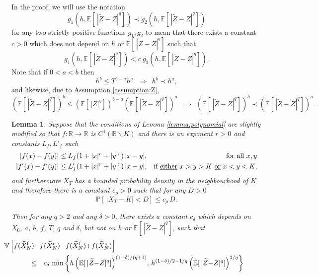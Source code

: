 \documentclass[11pt]{article}
\def \RR {{\mathbb{R}}}
\def \EE {{\mathbb{E}}}
\def \VV {{\mathbb{V}}}
\def \PP {{\mathbb{P}}}
\def \tZ {{\widetilde{Z}}}
\def \tXf  {{\widetilde{X}^{\rm f}}}
\def \tXc  {{\widetilde{X}^{\rm c}}}
\def \hXf {{\widehat{X}^{\rm f}}}
\def \hXc {{\widehat{X}^{\rm c}}}
\newtheorem{lemma}[theorem]{Lemma}
\begin{document}
In the proof, we will use the notation
\[
g_1(h, \EE[\, |\tZ{-}Z|^q]) \prec g_2(h, \EE[\, |\tZ{-}Z|^q])
\]
for any two strictly positive functions $g_1, g_2$ to mean that there
exists a constant $c\!>\!0$ which does not depend on $h$ or
$\EE[\, |\tZ{-}Z|^q]$ such that
\[
g_1(h, \EE[\, |\tZ{-}Z|^q]) < c\ g_2(h, \EE[\, |\tZ{-}Z|^q]).
\]
Note that if $0\!<\!a\!<\!b$ then
\[
h^b \leq T^{b-a} h^a
~~~ \Longrightarrow~~
h^b \prec h^a,
\]
and likewise, due to Assumption \ref{assumption:Z}, 
\[
\left(\EE[\, |\tZ{-}Z|^q]\right)^b \leq 
\left(\EE[\, |Z|^q] \right)^{b-a} \left(\EE[\, |\tZ{-}Z|^q]\right)^a
~~~ \Longrightarrow~~
\left(\EE[\, |\tZ{-}Z|^q]\right)^b \prec
\left(\EE[\, |\tZ{-}Z|^q]\right)^a.
\]


\begin{lemma}
\label{lemma:polynomial_2}
Suppose that the conditions of Lemma \ref{lemma:polynomial} are slightly
modified so that $f: \RR \rightarrow \RR$ is $C^1(\RR\backslash K)$ and 
there is an exponent $r\!>\!0$ and constants $L_f, L'_f$ such
\begin{eqnarray*}
|f(x)-f(y)| \leq L_f (1+|x|^r+|y|^r)\, |x-y|, && \mbox{for all } x, y\\
|f'(x)-f'(y)| \leq L'_f (1+|x|^r+|y|^r)\, |x-y|, && 
\mbox{if \underline{either}\ } x>y>K \mbox{\ \underline{or}\ } x<y<K,
\end{eqnarray*}
and furthermore $X_T$ has a bounded probability density in the 
neighbourhood of $K$ and therefore there is a constant $c_\rho\!>\!0$
such that for any $D\!>\!0$
\[
\PP[ \, |X_T{-}K| < D ] \leq c_\rho\, D.
\]

Then for any $q\!>\!2$ and any $\delta\!>\!0$,
there exists a constant $c_\delta$ which depends on $X_0$, $a$, $b$, 
$f$, $T$, $q$ 
and $\delta$, but not on $h$ or $\EE[\, |\tZ{-}Z|^q]$, such that
\begin{eqnarray}
\lefteqn{
\hspace{-0.5in}
\VV\left[ f(\hXf_N) {-} f(\hXc_N) {-} f(\tXf_N) {+} f(\tXc_N) \right] 
}
\nonumber \\ &\leq& c_\delta \, \min\left\{ 
h \left(\EE[\, |\tZ{-}Z|^q]\right)^{(1-\delta)/(q+1)}\!,\, 
h^{(1-\delta)/2-1/q} \left(\EE[\, |\tZ{-}Z|^q]\right)^{2/q} \right \}
\label{eq:bound}
\end{eqnarray}
\end{lemma}
\end{document}
